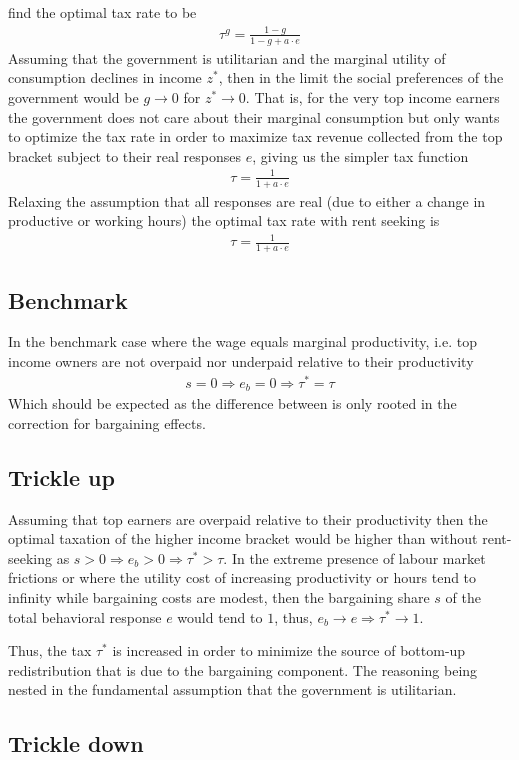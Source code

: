  find the optimal tax rate to be
\begin{align}
  \tau^{g} = \frac{1-g}{1-g+a\cdot e} \label{eq:social}
\end{align}
Assuming that the government is utilitarian and the marginal utility of consumption declines in income $z^{*}$, then in the limit the social preferences of the government would be $g\rightarrow0$ for $z^{*}\rightarrow0$. That is, for the very top income earners the government does not care about their marginal consumption but only wants to optimize the tax rate in order to maximize tax revenue collected from the top bracket subject to their real responses $e$, giving us the simpler tax function
\begin{align}
  \tau = \frac{1}{1+a\cdot e} \label{eq:nonlinear}
\end{align}
Relaxing the assumption that all responses are real (due to either a change in productive or working hours) the optimal tax rate with rent seeking is
\begin{align}
  \tau = \frac{1}{1+a\cdot e} \label{eq:rent}
\end{align}

\subsection{Benchmark}
In the benchmark case where the wage equals marginal productivity, i.e. top income owners are not overpaid nor underpaid relative to their productivity
\begin{align*}
  s=0\Rightarrow e_b=0 \Rightarrow \tau^{*} = \tau
\end{align*}
Which should be expected as the difference between %
is only rooted in the correction for bargaining effects.

\subsection{Trickle up}
Assuming that top earners are overpaid relative to their productivity then the optimal taxation of the higher income bracket would be higher than without rent-seeking as $s>0 \Rightarrow e_b>0 \Rightarrow \tau^{*}>\tau$. In the extreme presence of labour market frictions or where the utility cost of increasing productivity or hours tend to infinity while bargaining costs are modest, then the bargaining share $s$ of the total behavioral response $e$ would tend to $1$, thus, $e_b\rightarrow e \Rightarrow \tau^{*} \rightarrow 1$.\par
Thus, the tax $\tau^{*}$ is increased in order to minimize the source of bottom-up redistribution that is due to the bargaining component. The reasoning being nested in the fundamental assumption that the government is utilitarian.

\subsection{Trickle down}
